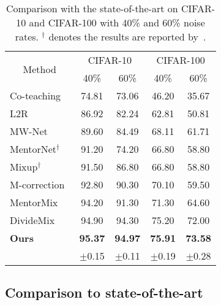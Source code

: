 \documentclass[final]{cvpr}
\begin{document}
\begin{table}[t]
	\centering
	\small
	\begin{tabular}{|lr|cc|cc|}
		\hline
		\multicolumn{2}{|c|}{\multirow{2}{*}{Method}}  & \multicolumn{2}{|c|}{CIFAR-10} & \multicolumn{2}{|c|}{CIFAR-100} \\
		\cline{3-6}
		      &  & 40\% & 60\% & 40\% & 60\% \\
		\hline

        \multicolumn{2}{|l|}{Co-teaching~\cite{han2018co}} & 74.81 & 73.06 & 46.20 & 35.67 \\  
        \hline
        \multicolumn{2}{|l|}{L2R~\cite{ren2018learning}}& 86.92 & 82.24 & 62.81 & 50.81 \\
        \hline
        \multicolumn{2}{|l|}{MW-Net~\cite{shu2019meta}} & 89.60 & 84.49 & 68.11 & 61.71 \\
        \hline
        \multicolumn{2}{|l|}{MentorNet$^{\dagger}$~\cite{jiang2017mentornet}} & 91.20 & 74.20 & 66.80 & 58.80 \\
        \hline
        \multicolumn{2}{|l|}{Mixup$^{\dagger}$~\cite{zhang2017mixup}} & 91.50 & 86.80 & 66.80 & 58.80 \\
        \hline
\multicolumn{2}{|l|}{M-correction~\cite{arazo2019unsupervised}} & 92.80 & 90.30 & 70.10 & 59.50 \\
        \hline
\multicolumn{2}{|l|}{MentorMix~\cite{jiang2020beyond}} & 94.20 & 91.30 & 71.30 & 64.60 \\
        \hline
\multicolumn{2}{|l|}{DivideMix~\cite{li2020dividemix}} & 94.90 & 94.30 & 75.20 & 72.00 \\
		\hline\hline
        \multicolumn{2}{|l|}{\textbf{Ours}} &  \textbf{95.37} & \textbf{94.97} & \textbf{75.91} & \textbf{73.58}  \\
                   &   &  {\footnotesize $\pm$0.15} & {\footnotesize $\pm$0.11} & {\footnotesize $\pm$0.19} & {\footnotesize $\pm$0.28}  \\
		\hline
	\end{tabular}
	\vspace{-1mm}
	\caption{Comparison with the state-of-the-art on CIFAR-10 and CIFAR-100 with 40\% and 60\% noise rates. $^{\dagger}$ denotes the results are reported by~\cite{jiang2020beyond}.}
	\label{tab:cifar_mwn}
	\vspace{-5mm}
\end{table}
 

\subsection{Comparison to state-of-the-art}\label{sec:exp_sota_noisy}
\end{document}
